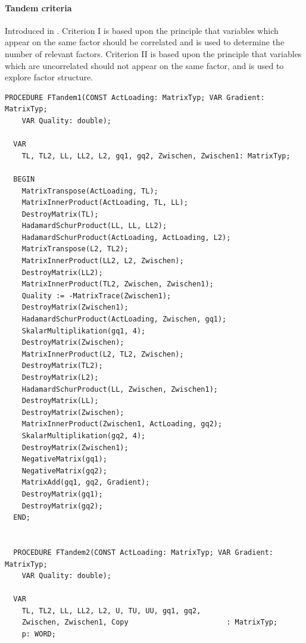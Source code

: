 \paragraph{Tandem criteria}

Introduced in \parencite{Com-67}. Criterion I is based upon the principle that variables which appear on the same factor should be correlated and is used to determine the number of relevant factors. Criterion II is based upon the principle that variables which are uncorrelated should not appear on the same factor, and is used to explore factor structure.

\begin{lstlisting}[caption=Tandem criteria]
  PROCEDURE FTandem1(CONST ActLoading: MatrixTyp; VAR Gradient: MatrixTyp;
    VAR Quality: double);

  VAR
    TL, TL2, LL, LL2, L2, gq1, gq2, Zwischen, Zwischen1: MatrixTyp;

  BEGIN
    MatrixTranspose(ActLoading, TL);
    MatrixInnerProduct(ActLoading, TL, LL);
    DestroyMatrix(TL);
    HadamardSchurProduct(LL, LL, LL2);
    HadamardSchurProduct(ActLoading, ActLoading, L2);
    MatrixTranspose(L2, TL2);
    MatrixInnerProduct(LL2, L2, Zwischen);
    DestroyMatrix(LL2);
    MatrixInnerProduct(TL2, Zwischen, Zwischen1);
    Quality := -MatrixTrace(Zwischen1);
    DestroyMatrix(Zwischen1);
    HadamardSchurProduct(ActLoading, Zwischen, gq1);
    SkalarMultiplikation(gq1, 4);
    DestroyMatrix(Zwischen);
    MatrixInnerProduct(L2, TL2, Zwischen);
    DestroyMatrix(TL2);
    DestroyMatrix(L2);
    HadamardSchurProduct(LL, Zwischen, Zwischen1);
    DestroyMatrix(LL);
    DestroyMatrix(Zwischen);
    MatrixInnerProduct(Zwischen1, ActLoading, gq2);
    SkalarMultiplikation(gq2, 4);
    DestroyMatrix(Zwischen1);
    NegativeMatrix(gq1);
    NegativeMatrix(gq2);
    MatrixAdd(gq1, gq2, Gradient);
    DestroyMatrix(gq1);
    DestroyMatrix(gq2);
  END;


  PROCEDURE FTandem2(CONST ActLoading: MatrixTyp; VAR Gradient: MatrixTyp;
    VAR Quality: double);

  VAR
    TL, TL2, LL, LL2, L2, U, TU, UU, gq1, gq2,
    Zwischen, Zwischen1, Copy                       : MatrixTyp;
    p: WORD;


\end{lstlisting}
